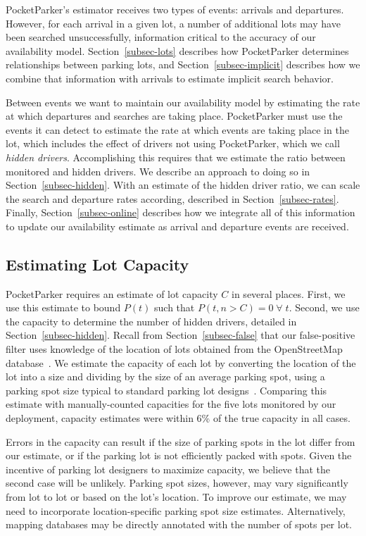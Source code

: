 PocketParker's estimator receives two types of events: arrivals and
departures. However, for each arrival in a given lot, a number of additional
lots may have been searched unsuccessfully, information critical to the
accuracy of our availability model. Section~\ref{subsec-lots} describes how
PocketParker determines relationships between parking lots, and
Section~\ref{subsec-implicit} describes how we combine that information with
arrivals to estimate implicit search behavior.

Between events we want to maintain our availability model by estimating the
rate at which departures and searches are taking place. PocketParker must use
the events it can detect to estimate the rate at which events are taking
place in the lot, which includes the effect of drivers not using
PocketParker, which we call \textit{hidden drivers}. Accomplishing this
requires that we estimate the ratio between monitored and hidden drivers.
We describe an approach to doing so in Section~\ref{subsec-hidden}. With an
estimate of the hidden driver ratio, we can scale the search and departure
rates according, described in Section~\ref{subsec-rates}. Finally,
Section~\ref{subsec-online} describes how we integrate all of this
information to update our availability estimate as arrival and departure
events are received.

\subsection{Estimating Lot Capacity}
\label{subsec-capacity}

PocketParker requires an estimate of lot capacity $C$ in several places.
First, we use this estimate to bound $P(t)$ such that $P(t, n > C) =
0\;\forall\;t$. Second, we use the capacity to determine the number of hidden
drivers, detailed in Section~\ref{subsec-hidden}. Recall from
Section~\ref{subsec-false} that our false-positive filter uses knowledge of
the location of lots obtained from the OpenStreetMap
database~\cite{openstreetmap}. We estimate the capacity of each lot by
converting the location of the lot into a size and dividing by the size of an
average parking spot, using a parking spot size typical to standard parking
lot designs~\cite{parkingdesign}. Comparing this estimate with
manually-counted capacities for the five lots monitored by our deployment,
capacity estimates were within 6\% of the true capacity in all cases.

Errors in the capacity can result if the size of parking spots in the lot
differ from our estimate, or if the parking lot is not efficiently packed
with spots. Given the incentive of parking lot designers to maximize
capacity, we believe that the second case will be unlikely. Parking spot
sizes, however, may vary significantly from lot to lot or based on the lot's
location. To improve our estimate, we may need to incorporate
location-specific parking spot size estimates. Alternatively, mapping
databases may be directly annotated with the number of spots per lot.

